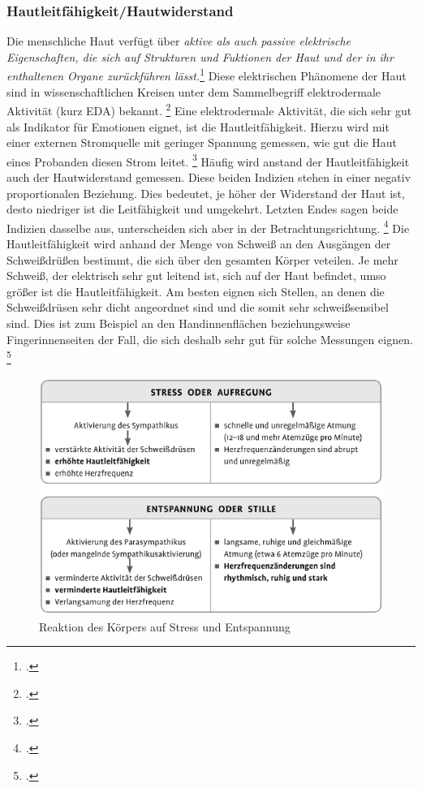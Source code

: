 \subsubsection{Hautleitfähigkeit/Hautwiderstand}
Die menschliche Haut verfügt über \glqq \textit{aktive als auch passive elektrische Eigenschaften, die sich auf Strukturen und Fuktionen der Haut und der in ihr enthaltenen Organe zurückführen lässt.}\grqq{}\footcite[][S. 2]{Bou88} Diese elektrischen Phänomene der Haut sind in wissenschaftlichen Kreisen unter dem Sammelbegriff elektrodermale Aktivität (kurz EDA) bekannt. \footcite[Vgl.][S. 2]{Bou88}
Eine elektrodermale Aktivität, die sich sehr gut als Indikator für Emotionen eignet, ist die Hautleitfähigkeit. Hierzu wird mit einer externen Stromquelle mit geringer Spannung gemessen, wie gut die Haut eines Probanden diesen Strom leitet. \footcite[Vgl. ][S.77]{Moe07} Häufig wird anstand der Hautleitfähigkeit auch der Hautwiderstand gemessen. Diese beiden Indizien stehen in einer negativ proportionalen Beziehung. Dies bedeutet, je höher der Widerstand der Haut ist, desto niedriger ist die Leitfähigkeit und umgekehrt. Letzten Endes sagen beide Indizien dasselbe aus, unterscheiden sich aber in der Betrachtungsrichtung. \footcite[Vgl. ][S. 28]{Die06} \newline
Die Hautleitfähigkeit wird anhand der Menge von Schweiß an den Ausgängen der Schweißdrüßen bestimmt, die sich über den gesamten Körper veteilen. Je mehr Schweiß, der elektrisch sehr gut leitend ist, sich auf der Haut befindet, umso größer ist die Hautleitfähigkeit. Am besten eignen sich  Stellen, an denen die Schweißdrüsen sehr dicht angeordnet sind und die somit sehr schweißsensibel sind. Dies ist zum Beispiel an den Handinnenflächen beziehungsweise Fingerinnenseiten der Fall, die sich deshalb sehr gut für solche Messungen eignen. \footcite[Vgl. ][S.77]{Moe07} 
\begin{figure}[h]
	\centering
	\includegraphics[width=16cm]{Bilder/symp.png}
	\caption[Reaktion des Körpers auf Stress und Entspannung]{Reaktion des Körpers auf Stress und Entspannung\footnotemark}
\end{figure}%

